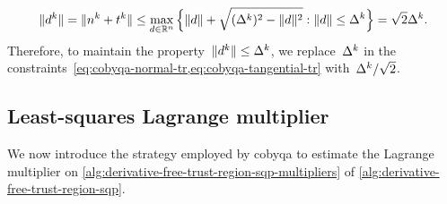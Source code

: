\begin{equation*}
    \norm{\step[k]} = \norm{\nstep[k] + \tstep[k]} \le \max_{d \in \R^n} \set[\Big]{\norm{d} + \sqrt{(\rad[k])^2 - \norm{\step}^2} : \norm{d} \le \rad[k]} = \sqrt{2} \rad[k].
\end{equation*}
Therefore, to maintain the property~$\norm{\step[k]} \le \rad[k]$, we replace~$\rad[k]$ in the constraints~\cref{eq:cobyqa-normal-tr,eq:cobyqa-tangential-tr} with~$\rad[k] / \sqrt{2}$.


\subsection{Least-squares Lagrange multiplier}
\label{subsec:least-squares-lagrange-multipliers}

We now introduce the strategy employed by \gls{cobyqa} to estimate the Lagrange multiplier on \cref{alg:derivative-free-trust-region-sqp-multipliers} of \cref{alg:derivative-free-trust-region-sqp}.

